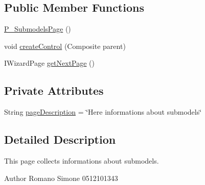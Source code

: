\subsection*{Public Member Functions}
\begin{DoxyCompactItemize}
\item 
\hyperlink{classit_1_1isislab_1_1masonhelperdocumentation_1_1mason_1_1wizards_1_1_p___submodels_page_a7199da5dcae14acb825c325422740815}{P\-\_\-\-Submodels\-Page} ()
\item 
void \hyperlink{classit_1_1isislab_1_1masonhelperdocumentation_1_1mason_1_1wizards_1_1_p___submodels_page_abb13a2fe489eca3bfc57364abe7eec77}{create\-Control} (Composite parent)
\item 
I\-Wizard\-Page \hyperlink{classit_1_1isislab_1_1masonhelperdocumentation_1_1mason_1_1wizards_1_1_p___submodels_page_a69fe8641f9c2bcdcef12d28517154dbe}{get\-Next\-Page} ()
\end{DoxyCompactItemize}
\subsection*{Private Attributes}
\begin{DoxyCompactItemize}
\item 
String \hyperlink{classit_1_1isislab_1_1masonhelperdocumentation_1_1mason_1_1wizards_1_1_p___submodels_page_aac10db6ba99042b75a9a3f18ac4537cb}{page\-Description} = \char`\"{}Here informations about submodels\char`\"{}
\end{DoxyCompactItemize}


\subsection{Detailed Description}
This page collects informations about submodels. \begin{DoxyAuthor}{Author}
Romano Simone 0512101343 
\end{DoxyAuthor}



